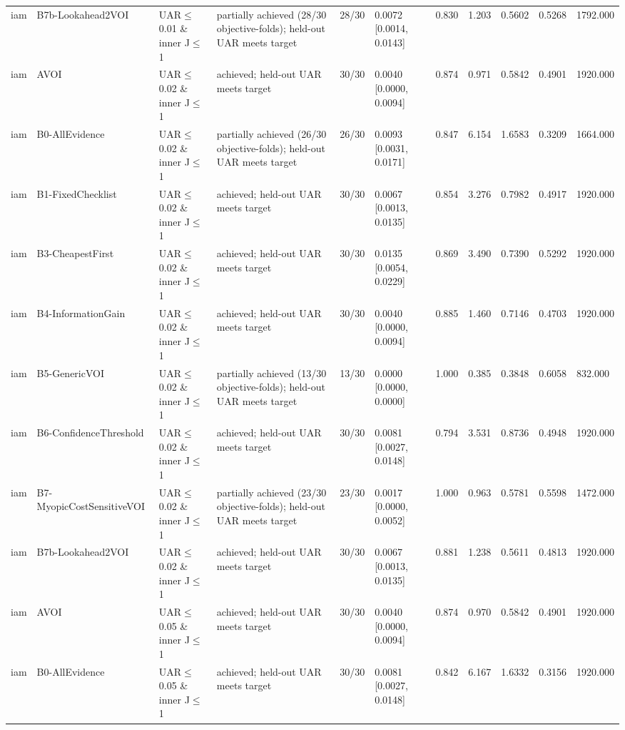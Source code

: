 \begin{table}[!ht]
{\begin{tabular}{lllllllllll}
iam & B7b-Lookahead2VOI & UAR$\le$0.01 \& inner J$\le$1 & partially achieved (28/30 objective-folds); held-out UAR meets target & 28/30 & 0.0072 [0.0014, 0.0143] & 0.830 & 1.203 & 0.5602 & 0.5268 & 1792.000 \\
iam & AVOI & UAR$\le$0.02 \& inner J$\le$1 & achieved; held-out UAR meets target & 30/30 & 0.0040 [0.0000, 0.0094] & 0.874 & 0.971 & 0.5842 & 0.4901 & 1920.000 \\
iam & B0-AllEvidence & UAR$\le$0.02 \& inner J$\le$1 & partially achieved (26/30 objective-folds); held-out UAR meets target & 26/30 & 0.0093 [0.0031, 0.0171] & 0.847 & 6.154 & 1.6583 & 0.3209 & 1664.000 \\
iam & B1-FixedChecklist & UAR$\le$0.02 \& inner J$\le$1 & achieved; held-out UAR meets target & 30/30 & 0.0067 [0.0013, 0.0135] & 0.854 & 3.276 & 0.7982 & 0.4917 & 1920.000 \\
iam & B3-CheapestFirst & UAR$\le$0.02 \& inner J$\le$1 & achieved; held-out UAR meets target & 30/30 & 0.0135 [0.0054, 0.0229] & 0.869 & 3.490 & 0.7390 & 0.5292 & 1920.000 \\
iam & B4-InformationGain & UAR$\le$0.02 \& inner J$\le$1 & achieved; held-out UAR meets target & 30/30 & 0.0040 [0.0000, 0.0094] & 0.885 & 1.460 & 0.7146 & 0.4703 & 1920.000 \\
iam & B5-GenericVOI & UAR$\le$0.02 \& inner J$\le$1 & partially achieved (13/30 objective-folds); held-out UAR meets target & 13/30 & 0.0000 [0.0000, 0.0000] & 1.000 & 0.385 & 0.3848 & 0.6058 & 832.000 \\
iam & B6-ConfidenceThreshold & UAR$\le$0.02 \& inner J$\le$1 & achieved; held-out UAR meets target & 30/30 & 0.0081 [0.0027, 0.0148] & 0.794 & 3.531 & 0.8736 & 0.4948 & 1920.000 \\
iam & B7-MyopicCostSensitiveVOI & UAR$\le$0.02 \& inner J$\le$1 & partially achieved (23/30 objective-folds); held-out UAR meets target & 23/30 & 0.0017 [0.0000, 0.0052] & 1.000 & 0.963 & 0.5781 & 0.5598 & 1472.000 \\
iam & B7b-Lookahead2VOI & UAR$\le$0.02 \& inner J$\le$1 & achieved; held-out UAR meets target & 30/30 & 0.0067 [0.0013, 0.0135] & 0.881 & 1.238 & 0.5611 & 0.4813 & 1920.000 \\
iam & AVOI & UAR$\le$0.05 \& inner J$\le$1 & achieved; held-out UAR meets target & 30/30 & 0.0040 [0.0000, 0.0094] & 0.874 & 0.970 & 0.5842 & 0.4901 & 1920.000 \\
iam & B0-AllEvidence & UAR$\le$0.05 \& inner J$\le$1 & achieved; held-out UAR meets target & 30/30 & 0.0081 [0.0027, 0.0148] & 0.842 & 6.167 & 1.6332 & 0.3156 & 1920.000 \\

\end{tabular}}
\end{table}
